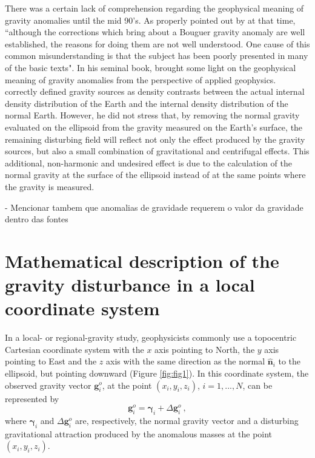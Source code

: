 \documentclass[paper,twocolumn,twoside]{geophysics}
\begin{document}
There was a certain lack of comprehension regarding the
geophysical meaning of gravity anomalies until the
mid 90's.
As properly pointed out by \citet{chapin1996} at that time, 
``although the corrections which bring about a Bouguer 
gravity anomaly are well established, the reasons for doing
them are not well understood. One cause of this common 
misunderstanding is that the subject has been poorly presented in
many of the basic texts".
In his seminal book, \citet{blakely1996} brought some light
on the geophysical meaning of gravity anomalies from the 
perspective of applied geophysics. \citet{blakely1996} correctly
defined gravity sources as density contrasts between the actual
internal density distribution of the Earth and the internal density
distribution of the normal Earth.
However, he did not stress that, by removing the normal gravity 
evaluated on the ellipsoid from the gravity measured 
on the Earth's surface, the remaining disturbing field will reflect 
not only the effect produced by the gravity sources, but also a
small combination of gravitational and centrifugal effects.
This additional, non-harmonic and undesired effect is 
due to the calculation of the normal gravity at the surface of the ellipsoid
instead of at the same points where the gravity is measured.

- Mencionar tambem que anomalias de gravidade requerem o
valor da gravidade dentro das fontes


\section{Mathematical description of the gravity disturbance in a local coordinate system}

In a local- or regional-gravity study, 
geophysicists commonly use a topocentric Cartesian coordinate system
with the $x$ axis pointing to North, the $y$ axis pointing to East and 
the $z$ axis with the same direction as the normal $\hat{\mathbf{n}}_{i}$
to the ellipsoid, but pointing downward (Figure \ref{fig:fig1}).
In this coordinate system, the observed gravity vector
$\mathbf{g}^{o}_{i}$, at the point $(x_{i}, y_{i}, z_{i})$, 
$i = 1, ..., N$, can be represented by
\begin{equation}
\mathbf{g}^{o}_{i} = \boldsymbol{\gamma}_{i} + \Delta \mathbf{g}^{o}_{i} \: ,
\label{eq:gravity-vector}
\end{equation}
where $\boldsymbol{\gamma}_{i}$ and $\Delta \mathbf{g}^{o}_{i}$
are, respectively, the normal gravity vector and a
disturbing gravitational attraction produced by the anomalous 
masses at the point $(x_{i}, y_{i}, z_{i})$.
\end{document}
